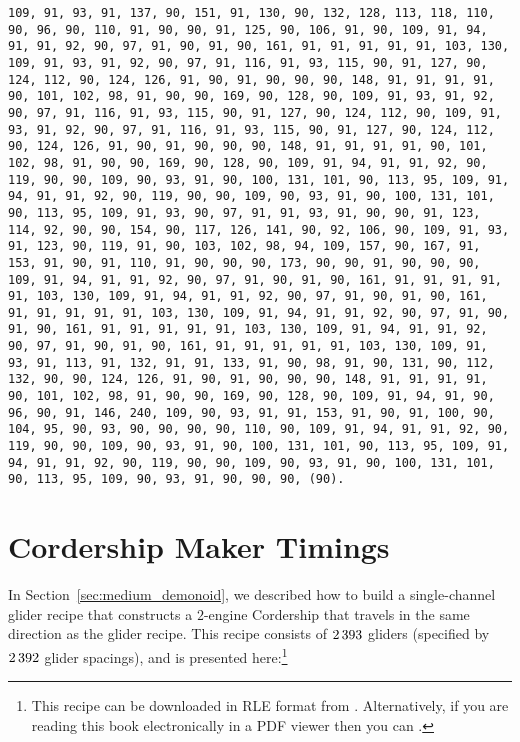 \begin{sloppypar}
	\noindent\texttt{\footnotesize 109, 91, 93, 91, 137, 90, 151, 91, 130, 90, 132, 128, 113, 118, 110, 90, 96, 90, 110, 91, 90, 90, 91, 125, 90, 106, 91, 90, 109, 91, 94, 91, 91, 92, 90, 97, 91, 90, 91, 90, 161, 91, 91, 91, 91, 91, 103, 130, 109, 91, 93, 91, 92, 90, 97, 91, 116, 91, 93, 115, 90, 91, 127, 90, 124, 112, 90, 124, 126, 91, 90, 91, 90, 90, 90, 148, 91, 91, 91, 91, 90, 101, 102, 98, 91, 90, 90, 169, 90, 128, 90, 109, 91, 93, 91, 92, 90, 97, 91, 116, 91, 93, 115, 90, 91, 127, 90, 124, 112, 90, 109, 91, 93, 91, 92, 90, 97, 91, 116, 91, 93, 115, 90, 91, 127, 90, 124, 112, 90, 124, 126, 91, 90, 91, 90, 90, 90, 148, 91, 91, 91, 91, 90, 101, 102, 98, 91, 90, 90, 169, 90, 128, 90, 109, 91, 94, 91, 91, 92, 90, 119, 90, 90, 109, 90, 93, 91, 90, 100, 131, 101, 90, 113, 95, 109, 91, 94, 91, 91, 92, 90, 119, 90, 90, 109, 90, 93, 91, 90, 100, 131, 101, 90, 113, 95, 109, 91, 93, 90, 97, 91, 91, 93, 91, 90, 90, 91, 123, 114, 92, 90, 90, 154, 90, 117, 126, 141, 90, 92, 106, 90, 109, 91, 93, 91, 123, 90, 119, 91, 90, 103, 102, 98, 94, 109, 157, 90, 167, 91, 153, 91, 90, 91, 110, 91, 90, 90, 90, 173, 90, 90, 91, 90, 90, 90, 109, 91, 94, 91, 91, 92, 90, 97, 91, 90, 91, 90, 161, 91, 91, 91, 91, 91, 103, 130, 109, 91, 94, 91, 91, 92, 90, 97, 91, 90, 91, 90, 161, 91, 91, 91, 91, 91, 103, 130, 109, 91, 94, 91, 91, 92, 90, 97, 91, 90, 91, 90, 161, 91, 91, 91, 91, 91, 103, 130, 109, 91, 94, 91, 91, 92, 90, 97, 91, 90, 91, 90, 161, 91, 91, 91, 91, 91, 103, 130, 109, 91, 93, 91, 113, 91, 132, 91, 91, 133, 91, 90, 98, 91, 90, 131, 90, 112, 132, 90, 90, 124, 126, 91, 90, 91, 90, 90, 90, 148, 91, 91, 91, 91, 90, 101, 102, 98, 91, 90, 90, 169, 90, 128, 90, 109, 91, 94, 91, 90, 96, 90, 91, 146, 240, 109, 90, 93, 91, 91, 153, 91, 90, 91, 100, 90, 104, 95, 90, 93, 90, 90, 90, 90, 110, 90, 109, 91, 94, 91, 91, 92, 90, 119, 90, 90, 109, 90, 93, 91, 90, 100, 131, 101, 90, 113, 95, 109, 91, 94, 91, 91, 92, 90, 119, 90, 90, 109, 90, 93, 91, 90, 100, 131, 101, 90, 113, 95, 109, 90, 93, 91, 90, 90, 90, {\color{gray}(90)}.}
\end{sloppypar}


\section{Cordership Maker Timings}\label{sec:appendix_cordership_maker}

In Section~\ref{sec:medium_demonoid}, we described how to build a single-channel glider recipe that constructs a $2$-engine Cordership that travels in the same direction as the glider recipe. This recipe consists of $2{\,}393$ gliders (specified by $2{\,}392$ glider spacings), and is presented here:\footnote{This recipe can be downloaded in RLE format from . Alternatively, if you are reading this book electronically in a PDF viewer then you can .}\\[-0.1cm]

